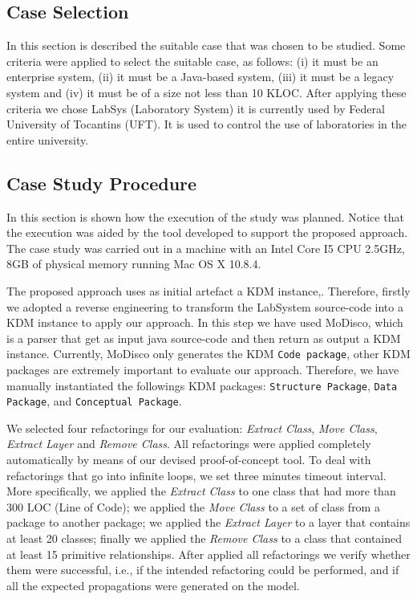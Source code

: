 \subsection{Case Selection}

In this section is described the suitable case that was chosen to be studied. Some criteria were applied to select the suitable case, as follows: (i) it must be an enterprise system, (ii) it must be a Java-based system, (iii) it must be a legacy system and (iv) it must be of a size not less than 10 KLOC. After applying these criteria we chose LabSys (Laboratory System) it is currently used by Federal University of Tocantins (UFT). It is used to control the use of laboratories in the entire university. 

\subsection{Case Study Procedure}\label{sec:caseStudyProcedure}

In this section is shown how the execution of the study was planned. Notice that the execution was aided by the tool developed to support the proposed approach. The case study was carried out in a machine with an Intel Core I5 CPU 2.5GHz, 8GB of physical memory running Mac OS X 10.8.4.

The proposed approach uses as initial artefact a KDM instance,. Therefore, firstly we adopted a reverse engineering to  transform the LabSystem source-code into a KDM instance to apply our approach. In this step we have used MoDisco\cite{Brunele20141012}, which is a parser that get as input java source-code and then return as output a KDM instance. Currently, MoDisco only generates the KDM \texttt{Code package}, other KDM packages are extremely important to evaluate our approach. Therefore, we have manually instantiated the followings KDM packages: \texttt{Structure Package}, \texttt{Data Package}, and \texttt{Conceptual Package}.


We selected four refactorings for our evaluation: \textit{Extract Class}, \textit{Move Class}, \textit{Extract Layer} and \textit{Remove Class}. %
All refactorings were applied completely automatically by means of our devised proof-of-concept tool. To deal with refactorings that go into infinite loops, we set three minutes timeout interval. More specifically, we applied the \textit{Extract Class} to one class that had more than 300 LOC (Line of Code); we applied the \textit{Move Class} to a set of  class from a package to another package; we applied the \textit{Extract Layer} to a layer that contains at least 20 classes; finally we applied the \textit{Remove Class} to a class that contained at least 15 primitive relationships. After applied all refactorings we verify whether them were successful, i.e., if the intended refactoring could be performed, and if all the expected propagations were generated on the model. 

